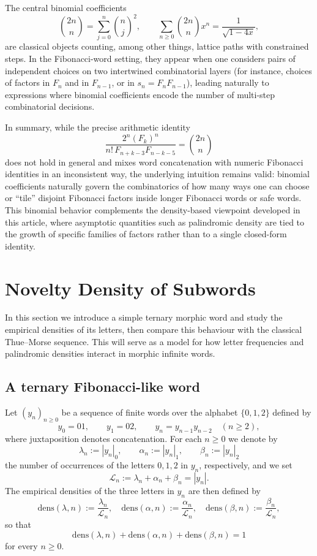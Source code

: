 \documentclass[12pt]{amsart}
\begin{document}
The central binomial coefficients
\[
\binom{2n}{n} = \sum_{j=0}^n \binom{n}{j}^2,\qquad
\sum_{n\ge 0} \binom{2n}{n} x^n = \frac{1}{\sqrt{1-4x}},
\]
are classical objects counting, among other things, lattice paths with constrained steps. In the Fibonacci-word setting, they appear when one considers pairs of independent choices on two intertwined combinatorial layers (for instance, choices of factors in $F_n$ and in $F_{n-1}$, or in $s_n = F_nF_{n-1}$), leading naturally to expressions where binomial coefficients encode the number of multi-step combinatorial decisions.

In summary, while the precise arithmetic identity
\[
\frac{2^n (F_k)^n}{n!\,F_{n+k-3}F_{n-k-5}} = \binom{2n}{n}
\]
does not hold in general and mixes word concatenation with numeric Fibonacci identities in an inconsistent way, the underlying intuition remains valid: binomial coefficients naturally govern the combinatorics of how many ways one can choose or ``tile'' disjoint Fibonacci factors inside longer Fibonacci words or safe words. This binomial behavior complements the density-based viewpoint developed in this article, where asymptotic quantities such as palindromic density are tied to the growth of specific families of factors rather than to a single closed-form identity.
\section{Novelty Density of Subwords}\label{sec:Density}

In this section we introduce a simple ternary morphic word and study the empirical densities of its letters, then compare this behaviour with the classical Thue--Morse sequence. This will serve as a model for how letter frequencies and palindromic densities interact in morphic infinite words.

\subsection{A ternary Fibonacci-like word}

Let $(y_n)_{n\ge 0}$ be a sequence of finite words over the alphabet $\{0,1,2\}$ defined by
\[
y_0 = 01,\qquad y_1 = 02,\qquad y_n = y_{n-1}y_{n-2}\quad (n\ge 2),
\]
where juxtaposition denotes concatenation. For each $n\ge 0$ we denote by
\[
\lambda_n := |y_n|_0,\qquad \alpha_n := |y_n|_1,\qquad \beta_n := |y_n|_2
\]
the number of occurrences of the letters $0,1,2$ in $y_n$, respectively, and we set
\[
\mathcal{L}_n := \lambda_n + \alpha_n + \beta_n = |y_n|.
\]
The empirical densities of the three letters in $y_n$ are then defined by
\begin{equation}\label{eq1densityn1}
\mathrm{dens}(\lambda,n) := \frac{\lambda_n}{\mathcal{L}_n},\quad
\mathrm{dens}(\alpha,n) := \frac{\alpha_n}{\mathcal{L}_n},\quad
\mathrm{dens}(\beta,n) := \frac{\beta_n}{\mathcal{L}_n},
\end{equation}
so that
\[
\mathrm{dens}(\lambda,n) + \mathrm{dens}(\alpha,n) + \mathrm{dens}(\beta,n) = 1
\]
for every $n\ge 0$.
\end{document}
